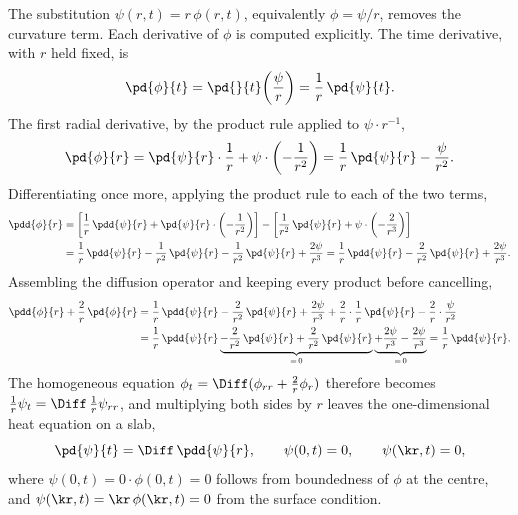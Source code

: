 The substitution $\psi(r,t) = r\,\phi(r,t)$, equivalently $\phi = \psi/r$, removes
the curvature term. Each derivative of $\phi$ is computed explicitly. The time
derivative, with $r$ held fixed, is
%
\begin{equation}
  \pd{\phi}{t} = \pd{}{t}\!\left( \frac{\psi}{r} \right)
  = \frac{1}{r}\,\pd{\psi}{t} .
\end{equation}
%
The first radial derivative, by the product rule applied to $\psi \cdot r^{-1}$,
%
\begin{equation}
  \pd{\phi}{r}
  = \pd{\psi}{r}\cdot\frac{1}{r} + \psi \cdot \left( -\frac{1}{r^{2}} \right)
  = \frac{1}{r}\,\pd{\psi}{r} - \frac{\psi}{r^{2}} .
\end{equation}
%
Differentiating once more, applying the product rule to each of the two terms,
%
\begin{align}
  \pdd{\phi}{r}
  &= \left[ \frac{1}{r}\,\pdd{\psi}{r}
     + \pd{\psi}{r}\cdot\left( -\frac{1}{r^{2}} \right) \right]
   - \left[ \frac{1}{r^{2}}\,\pd{\psi}{r}
     + \psi \cdot \left( -\frac{2}{r^{3}} \right) \right] \notag \\
  &= \frac{1}{r}\,\pdd{\psi}{r}
   - \frac{1}{r^{2}}\,\pd{\psi}{r}
   - \frac{1}{r^{2}}\,\pd{\psi}{r}
   + \frac{2\psi}{r^{3}}
  = \frac{1}{r}\,\pdd{\psi}{r}
   - \frac{2}{r^{2}}\,\pd{\psi}{r}
   + \frac{2\psi}{r^{3}} .
\end{align}
%
Assembling the diffusion operator and keeping every product before cancelling,
%
\begin{align}
  \pdd{\phi}{r} + \frac{2}{r}\,\pd{\phi}{r}
  &= \frac{1}{r}\,\pdd{\psi}{r}
   - \frac{2}{r^{2}}\,\pd{\psi}{r}
   + \frac{2\psi}{r^{3}}
   + \frac{2}{r}\cdot\frac{1}{r}\,\pd{\psi}{r}
   - \frac{2}{r}\cdot\frac{\psi}{r^{2}} \notag \\
  &= \frac{1}{r}\,\pdd{\psi}{r}
   \underbrace{- \frac{2}{r^{2}}\,\pd{\psi}{r}
   + \frac{2}{r^{2}}\,\pd{\psi}{r}}_{=\,0}
   \underbrace{+ \frac{2\psi}{r^{3}}
   - \frac{2\psi}{r^{3}}}_{=\,0}
  = \frac{1}{r}\,\pdd{\psi}{r} .
\end{align}
%
The homogeneous equation $\phi_t = \Diff(\phi_{rr} + \tfrac{2}{r}\phi_r)$ therefore
becomes $\tfrac{1}{r}\psi_t = \Diff\,\tfrac{1}{r}\psi_{rr}$, and multiplying both
sides by $r$ leaves the one-dimensional heat equation on a slab,
%
\begin{equation}
  \pd{\psi}{t} = \Diff\,\pdd{\psi}{r} , \qquad
  \psi(0,t) = 0 , \qquad \psi(\kr,t) = 0 ,
  \label{eq:slab}
\end{equation}
%
where $\psi(0,t) = 0 \cdot \phi(0,t) = 0$ follows from boundedness of $\phi$ at the
centre, and $\psi(\kr,t) = \kr\,\phi(\kr,t) = 0$ from the surface condition.

